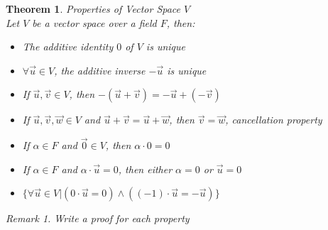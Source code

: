 \documentclass{book}
\newtheorem{theorem}{Theorem}[section]
\theoremstyle{definition}
\theoremstyle{remark}
\newtheorem{remark}{Remark}
\newcommand{\m}{\cdot}
\begin{document}
\begin{tcolorbox}
    \begin{theorem}
    Properties of Vector Space $V$ \\
    
        Let $V$ be a vector space over a field $F$, then: 
            \begin{itemize}
                \item The additive identity $0$ of $V$ is unique
                \item $\forall \vec{u} \in V$, the additive inverse $-\vec{u}$ is unique
                \item If $\vec{u},\vec{v} \in V$, then $-(\vec{u} + \vec{v}) = -\vec{u} + (-\vec{v})$
                \item If $\vec{u}, \vec{v}, \vec{w} \in V$ and $\vec{u} + \vec{v} = \vec{u} + \vec{w}$, then $\vec{v} = \vec{w}$, \textit{cancellation property}
                \item If $\alpha \in F$ and $\vec{0} \in V$, then $\alpha \m 0 = 0$
                \item If $\alpha \in F$ and $\alpha \m \vec{u} = 0$, then either $\alpha = 0$ or $\vec{u} = 0$ 
                \item $\{ \forall \vec{u} \in V | (0 \m \vec{u} = 0) \wedge ((-1) \m \vec{u} = -\vec{u}) \}$ 
            \end{itemize}
    
        \begin{remark}
            Write a proof for each property
        \end{remark}
    \end{theorem}
\end{tcolorbox}

\newpage
\end{document}
